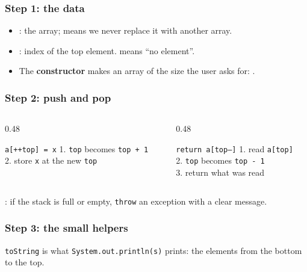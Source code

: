 \documentclass[aspectratio=169,10pt,compress]{beamer}
\begin{document}
\begin{frame}[t,fragile] \frametitle{Step 1: the data}
  \begin{itemize}\small
    \item {}: the array;  means we never replace it with another array.
    \item {}: index of the top element.  means ``no element''.
    \item The \textbf{constructor} makes an array of the size the user asks for: .
  \end{itemize}
\end{frame}




\begin{frame}[t,fragile] \frametitle{Step 2: push and pop}
  \begin{columns}[T]
    \begin{column}{0.48\textwidth}
      \begin{block}{\texttt{a[++top] = x}}
        \small 1. \texttt{top} becomes \texttt{top + 1}\\ 2. store \texttt{x} at the new \texttt{top}
      \end{block}
    \end{column}
    \begin{column}{0.48\textwidth}
      \begin{block}{\texttt{return a[top--]}}
        \small 1. read \texttt{a[top]}\\ 2. \texttt{top} becomes \texttt{top - 1}\\ 3. return what was read
      \end{block}
    \end{column}
  \end{columns}
  \small {}: if the stack is full or empty, \texttt{throw} an exception with a clear message.
\end{frame}




\begin{frame}[t,fragile] \frametitle{Step 3: the small helpers}
  \small \texttt{toString} is what \texttt{System.out.println(s)} prints: the elements from the bottom to the top.
\end{frame}
\end{document}
